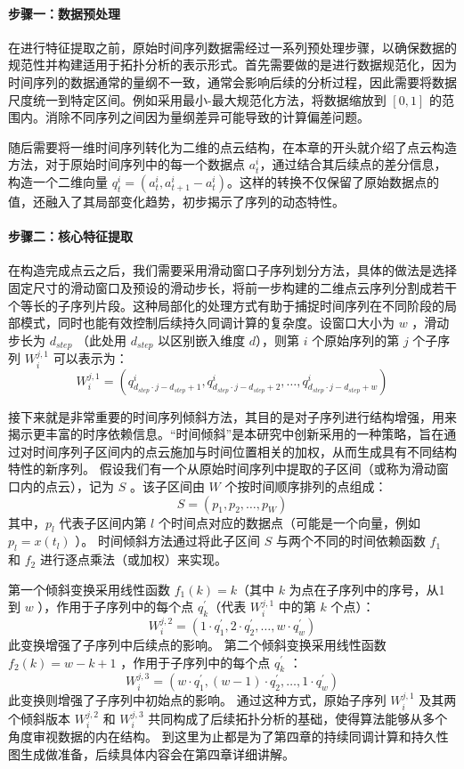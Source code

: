 \paragraph*{步骤一：数据预处理}
在进行特征提取之前，原始时间序列数据需经过一系列预处理步骤，以确保数据的规范性并构建适用于拓扑分析的表示形式。首先需要做的是进行数据规范化，因为时间序列的数据通常的量纲不一致，通常会影响后续的分析过程，因此需要将数据尺度统一到特定区间。例如采用最小-最大规范化方法，将数据缩放到 $[0, 1]$ 的范围内。消除不同序列之间因为量纲差异可能导致的计算偏差问题。

随后需要将一维时间序列转化为二维的点云结构，在本章的开头就介绍了点云构造方法，对于原始时间序列中的每一个数据点 $a_t^i$，通过结合其后续点的差分信息，构造一个二维向量 $q_t^i = (a_t^i, a_{t+1}^i - a_t^i)$。这样的转换不仅保留了原始数据点的值，还融入了其局部变化趋势，初步揭示了序列的动态特性。
%
\paragraph*{步骤二：核心特征提取}
在构造完成点云之后，我们需要采用滑动窗口子序列划分方法，具体的做法是选择固定尺寸的滑动窗口及预设的滑动步长，将前一步构建的二维点云序列分割成若干个等长的子序列片段。这种局部化的处理方式有助于捕捉时间序列在不同阶段的局部模式，同时也能有效控制后续持久同调计算的复杂度。设窗口大小为 $w$ ，滑动步长为 $d_{step}$ （此处用 $d_{step}$ 以区别嵌入维度 $d$），则第 $i$ 个原始序列的第 $j$ 个子序列 $W_i^{j, 1}$ 可以表示为：
\begin{equation}
    W_i^{j, 1}=\left(q_{d_{step} \cdot j-d_{step}+1}^i, q_{d_{step} \cdot j-d_{step}+2}^i, \ldots, q_{d_{step} \cdot j-d_{step}+w}^i\right)
\end{equation}

接下来就是非常重要的时间序列倾斜方法，其目的是对子序列进行结构增强，用来揭示更丰富的时序依赖信息。“时间倾斜”是本研究中创新采用的一种策略，旨在通过对时间序列子区间内的点云施加与时间位置相关的加权，从而生成具有不同结构特性的新序列。
假设我们有一个从原始时间序列中提取的子区间（或称为滑动窗口内的点云），记为 $S$ 。该子区间由 $W$ 个按时间顺序排列的点组成：
\begin{equation}
    S=\left(p_1, p_2, \ldots, p_W\right)
\end{equation}
其中，$p_l$ 代表子区间内第 $l$ 个时间点对应的数据点（可能是一个向量，例如 $p_l=x\left(t_l\right)$ ）。
时间倾斜方法通过将此子区间 $S$ 与两个不同的时间依赖函数 $f_1$ 和 $f_2$ 进行逐点乘法（或加权）来实现。

第一个倾斜变换采用线性函数 $f_1(k)=k$（其中 $k$ 为点在子序列中的序号，从1到 $w$ ），作用于子序列中的每个点 $q_k^{\prime}$（代表 $W_i^{j, 1}$ 中的第 $k$ 个点）：
$$
    W_i^{j, 2}=\left(1 \cdot q_1^{\prime}, 2 \cdot q_2^{\prime}, \ldots, w \cdot q_w^{\prime}\right)
$$
此变换增强了子序列中后续点的影响。
第二个倾斜变换采用线性函数 $f_2(k)=w-k+1$ ，作用于子序列中的每个点 $q_k^{\prime}$ ：
$$
    W_i^{j, 3}=\left(w \cdot q_1^{\prime},(w-1) \cdot q_2^{\prime}, \ldots, 1 \cdot q_w^{\prime}\right)
$$
此变换则增强了子序列中初始点的影响。
通过这种方式，原始子序列 $W_i^{j, 1}$ 及其两个倾斜版本 $W_i^{j, 2}$ 和 $W_i^{j, 3}$ 共同构成了后续拓扑分析的基础，使得算法能够从多个角度审视数据的内在结构。
到这里为止都是为了第四章的持续同调计算和持久性图生成做准备，后续具体内容会在第四章详细讲解。

